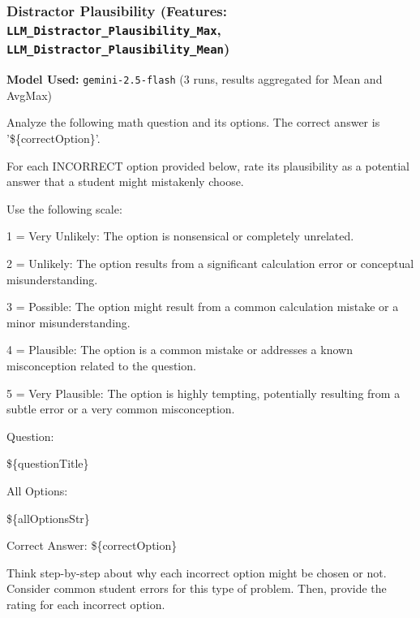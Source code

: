 \documentclass[
    a4paper, %
    10pt, %
    twoside, %
]{LTJournalArticle}
\begin{document}
\subsubsection{Distractor Plausibility (Features: \texttt{LLM\_Distractor\_Plausibility\_Max}, \texttt{LLM\_Distractor\_Plausibility\_Mean})}
\label{app:prompt_distractor_plausibility}
\textbf{Model Used:} \texttt{gemini-2.5-flash} (3 runs, results aggregated for Mean and AvgMax)
\begin{promptbox}
Analyze the following math question and its options. The correct answer is '\$\{correctOption\}'.

\vspace{1em}

For each INCORRECT option provided below, rate its plausibility as a potential answer that a student might mistakenly choose.

\vspace{1em}

Use the following scale:

1 = Very Unlikely: The option is nonsensical or completely unrelated.

2 = Unlikely: The option results from a significant calculation error or conceptual misunderstanding.

3 = Possible: The option might result from a common calculation mistake or a minor misunderstanding.

4 = Plausible: The option is a common mistake or addresses a known misconception related to the question.

5 = Very Plausible: The option is highly tempting, potentially resulting from a subtle error or a very common misconception.

\vspace{1em}

Question:

\$\{questionTitle\}

\vspace{1em}

All Options:

\$\{allOptionsStr\}

\vspace{1em}

Correct Answer: \$\{correctOption\}

\vspace{1em}
Think step-by-step about why each incorrect option might be chosen or not. Consider common student errors for this type of problem. Then, provide the rating for each incorrect option.
\end{promptbox}
\end{document}

